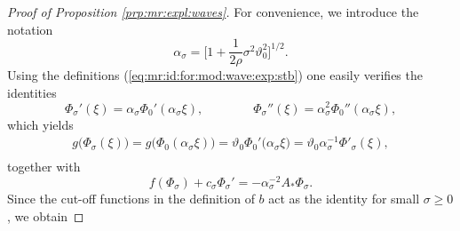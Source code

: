 \documentclass[10pt]{articleHJ}
\newcommand{\sref}[1]{(\ref{#1})}                       %
\numberwithin{equation}{section}
\begin{document}
\begin{proof}[Proof of Proposition \ref{prp:mr:expl:waves}]
For convenience, we introduce the notation
\begin{equation}
\alpha_{\sigma}
  =
  \big[ 1 + \frac{1}{2\rho} \sigma^2 \vartheta_{0}^2 \big]^{1/2}.
\end{equation}
Using the definitions \sref{eq:mr:id:for:mod:wave:exp:stb}
one easily verifies the identities
\begin{equation}
\Phi_{\sigma}'(\xi)
= \alpha_{\sigma}
  \Phi_0'(
    \alpha_{\sigma} \xi
  ),
\qquad \qquad
\Phi_{\sigma}''(\xi)
= \alpha_{\sigma}^2
  \Phi_0''(
    \alpha_{\sigma} \xi
  ),
\end{equation}
which yields
\begin{equation}
\begin{array}{lcl}
g\big(\Phi_{\sigma}(\xi)\big)
= g\big( \Phi_0( \alpha_{\sigma} \xi) \big)
= \vartheta_0 \Phi_0'\big(\alpha_{\sigma} \xi\big)
= \vartheta_0 \alpha_{\sigma}^{-1} \Phi'_{\sigma}(\xi),
\\[0.2cm]
\end{array}
\end{equation}
together with
\begin{equation}
f(\Phi_{\sigma} ) + c_{\sigma} \Phi_{\sigma}'
= - \alpha_{\sigma}^{-2} A_* \Phi_{\sigma}.
\end{equation}
Since
the cut-off functions in the definition of $b$
act as the identity for small $\sigma \ge 0$,
we obtain


\end{proof}
\end{document}
